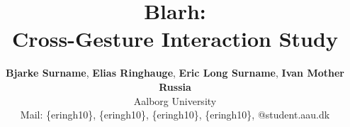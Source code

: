 
\title{Blarh:\\Cross-Gesture Interaction Study}
\author{
\textbf{Bjarke Surname}, 
\textbf{Elias Ringhauge}, 
\textbf{Eric Long Surname}, 
\textbf{Ivan Mother Russia}
\\Aalborg University
\\Mail: 
\{eringh10\},
\{eringh10\},
\{eringh10\},
\{eringh10\},
 @student.aau.dk}

\maketitle


\begin{refsection}[Literaturereview]
   \printbibliography[heading=bibnumbered, title={Refferences}]
\end{refsection}





\begin{refsection}[Paper]
   \printbibliography[heading=bibnumbered, title={Refferences}]
\end{refsection}

